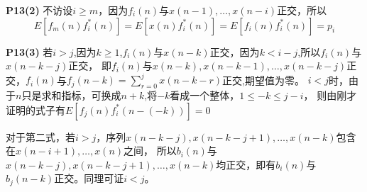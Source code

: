 \documentclass{article}
\begin{document}
\textbf{P13(2)}
不访设$i\geq m$，因为$f_i(n)$与$x(n-1),\dots,x(n-i)$正交，所以
\begin{equation}
E[f_m(n)f_i^*(n)]=E[x(n)f_i^*(n)]=E[f_i(n)f_i^*(n)]=p_i
\end{equation}

\textbf{P13(3)}
若$i>j$,因为$k\geq 1$,$f_i(n)$与$x(n-k)$正交，因为$k<i-j$,所以$f_i(n)$与$x(n-k-j)$正交，
即$f_i(n)$与$x(n-k),x(n-k-1),\dots,x(n-k-j)$正交，$f_i(n)$与$f_j(n-k)=\sum_{r=0}^{j} x(n-k-r)$正交,期望值为零。
$i<j$时，由于$n$只是求和指标，可换成$n+k$,将$-k$看成一个整体，$1\leq -k \leq j-i$，
则由刚才证明的式子有$E[f_j(n)f_i^*(n-(-k))]=0$

对于第二式，若$i>j$，序列$x(n-k-j),x(n-k-j+1),\dots,x(n-k)$包含在$x(n-i+1),\dots,x(n)$之间，
所以$b_i(n)$与$x(n-k-j),x(n-k-j+1),\dots,x(n-k)$均正交，即有$b_i(n)$与$b_j(n-k)$正交。同理可证$i<j$。



\begin{equation}
\end{equation}
\end{document}
